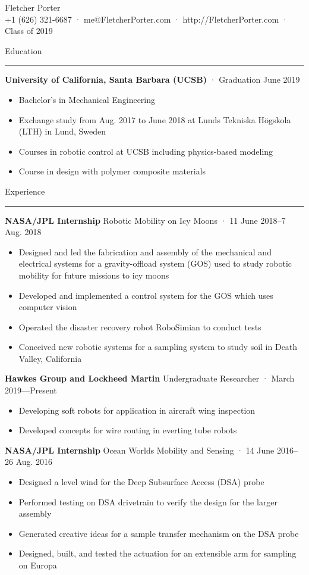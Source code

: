 \documentclass[12pt, oneside]{article}
\newcommand{\titlestyle}[1] {
	{\fontsize{50pt}{1em}\selectfont \textcolor{new_red}{\textsf{#1}}} \\
}
\newcommand{\headingstyleJobs}[1] {
	{\fontsize{19pt}{1em}\selectfont \textcolor{new_red}{\textsf{#1}}}
	\textcolor{new_red}{\rule{3.25in}{0.5pt}} \vspace{3pt}
}
\newcommand{\infostyle}[1] {
	{\fontsize{9pt}{1em}\selectfont #1} \\ \vspace{10pt}
}
\newcommand{\jobtitle}[3] {
	{\bf #1} {#2} · {#3} \vspace{-10pt} \\
}
\begin{document}
\begin{flushleft}



\titlestyle{Fletcher Porter}
\infostyle{+1 (626) 321-6687 · me@FletcherPorter.com · http://FletcherPorter.com · Class of 2019}


\headingstyleJobs{Education}

\jobtitle{University of California, Santa Barbara (UCSB)}{}{Graduation June 2019}
\begin{itemize}
	\item Bachelor's in Mechanical Engineering
	\item Exchange study from Aug. 2017 to June 2018 at Lunds Tekniska Högskola (LTH) in Lund, Sweden
	\item Courses in robotic control at UCSB including physics-based modeling
	\item Course in design with polymer composite materials
\end{itemize}


\headingstyleJobs{Experience}

\jobtitle{NASA/JPL Internship}{Robotic Mobility on Icy Moons}{11 June 2018–7 Aug. 2018}
\begin{itemize}
	\item Designed and led the fabrication and assembly of the mechanical and electrical systems for a gravity-offload system (GOS)  used to study robotic mobility for future missions to icy moons
	\item Developed and implemented a control system for the GOS which uses computer vision
	\item Operated the disaster recovery robot RoboSimian to conduct tests
	\item Conceived new robotic systems for a sampling system to study soil in Death Valley, California
\end{itemize}

\jobtitle{Hawkes Group and Lockheed Martin}{Undergraduate Researcher}{March 2019—Present}
\begin{itemize}
	\item Developing soft robots for application in aircraft wing inspection
	\item Developed concepts for wire routing in everting tube robots
\end{itemize}

\jobtitle{NASA/JPL Internship}{Ocean Worlds Mobility and Sensing}{14 June 2016–26 Aug. 2016}
\def\HrefFont{\em}
\begin{itemize}
	\item Designed a level wind for the Deep Subsurface Access (DSA) probe
	\item Performed testing on DSA drivetrain to verify the design for the larger assembly
	\item Generated creative ideas for a sample transfer mechanism on the DSA probe
	\item Designed, built, and tested the actuation for an extensible arm for sampling on Europa
\end{itemize}


\end{flushleft}
\end{document}
